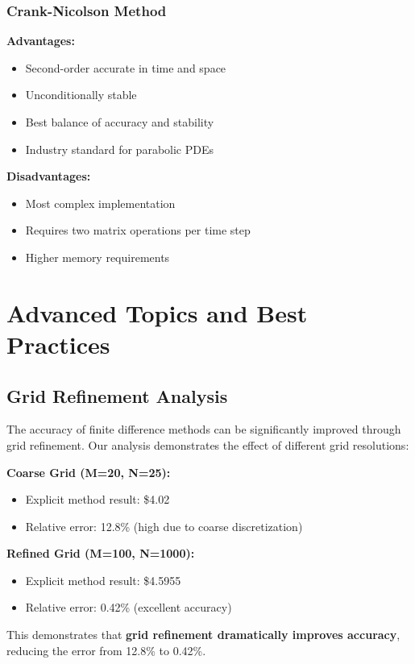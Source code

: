 \documentclass[12pt,a4paper]{article}
\numberwithin{algorithm}{subsection}
\begin{document}
\subsubsection{Crank-Nicolson Method}
\textbf{Advantages:}
\begin{itemize}
\item Second-order accurate in time and space
\item Unconditionally stable
\item Best balance of accuracy and stability
\item Industry standard for parabolic PDEs
\end{itemize}

\textbf{Disadvantages:}
\begin{itemize}
\item Most complex implementation
\item Requires two matrix operations per time step
\item Higher memory requirements
\end{itemize}

\section{Advanced Topics and Best Practices}

\subsection{Grid Refinement Analysis}

The accuracy of finite difference methods can be significantly improved through grid refinement. Our analysis demonstrates the effect of different grid resolutions:

\textbf{Coarse Grid (M=20, N=25):}
\begin{itemize}
\item Explicit method result: \$4.02
\item Relative error: 12.8\% (high due to coarse discretization)
\end{itemize}

\textbf{Refined Grid (M=100, N=1000):}
\begin{itemize}
\item Explicit method result: \$4.5955
\item Relative error: 0.42\% (excellent accuracy)
\end{itemize}

This demonstrates that \textbf{grid refinement dramatically improves accuracy}, reducing the error from 12.8\% to 0.42\%.
\end{document}
